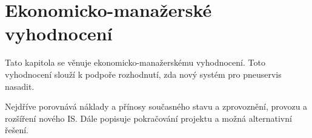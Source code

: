 \chapter{Ekonomicko-manažerské vyhodnocení} 
Tato kapitola se věnuje ekonomicko-manažerskému vyhodnocení. Toto vyhodnocení slouží k podpoře rozhodnutí, zda nový systém pro pneuservis nasadit. 

Nejdříve porovnává náklady a přínosy současného stavu a zprovoznění, provozu a rozšíření nového IS. Dále popisuje pokračování projektu a možná alternativní řešení.



